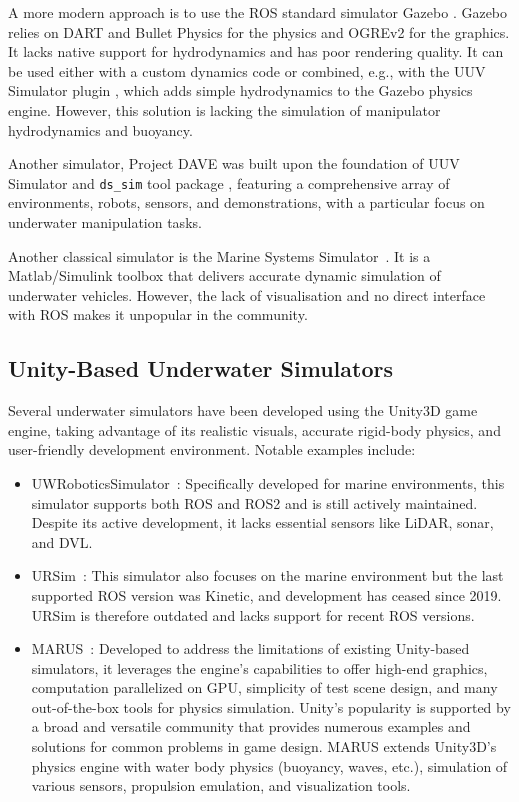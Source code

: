 A more modern approach is to use the ROS standard simulator Gazebo \cite{gazebo}. Gazebo relies on DART and Bullet Physics for the physics and OGREv2 for the graphics. It lacks native support for hydrodynamics and has poor rendering quality. It can be used either with a custom dynamics code or combined, e.g., with the UUV Simulator plugin \cite{Manhaes_2016}, which adds simple hydrodynamics to the Gazebo physics engine. However, this solution is lacking the simulation of manipulator hydrodynamics and buoyancy. 

Another simulator, Project DAVE \cite{zhang_dave_2022} was built upon the foundation of UUV Simulator \cite{manhaesUUVSimulatorGazebobased2016} and \texttt{ds\_sim} tool package \cite{WhoidslDs_simBitbucket}, featuring a comprehensive array of environments, robots, sensors, and demonstrations, with a particular focus on underwater manipulation tasks.

Another classical simulator is the Marine Systems Simulator~\cite{perez2006overview}. It is a Matlab/Simulink toolbox that delivers accurate dynamic simulation of underwater vehicles. However, the lack of visualisation and no direct interface with ROS makes it unpopular in the community.


\subsection{Unity-Based Underwater Simulators}
Several underwater simulators have been developed using the Unity3D game engine, taking advantage of its realistic visuals, accurate rigid-body physics, and user-friendly development environment. Notable examples include:

\begin{itemize}


\item UWRoboticsSimulator~\cite{UwRoboticsSim}: Specifically developed for marine environments, this simulator supports both ROS and ROS2 and is still actively maintained. Despite its active development, it lacks essential sensors like LiDAR, sonar, and DVL.

\item URSim~\cite{URSim}: This simulator also focuses on the marine environment but the last supported ROS version was Kinetic, and development has ceased since 2019. URSim is therefore outdated and lacks support for recent ROS versions.

\item MARUS~\cite{Marus}: Developed to address the limitations of existing Unity-based simulators, it leverages the engine's capabilities to offer high-end graphics, computation parallelized on GPU, simplicity of test scene design, and many out-of-the-box tools for physics simulation. Unity’s popularity is supported by a broad and versatile community that provides numerous examples and solutions for common problems in game design. MARUS extends Unity3D’s physics engine with water body physics (buoyancy, waves, etc.), simulation of various sensors, propulsion emulation, and visualization tools.

\end{itemize}

